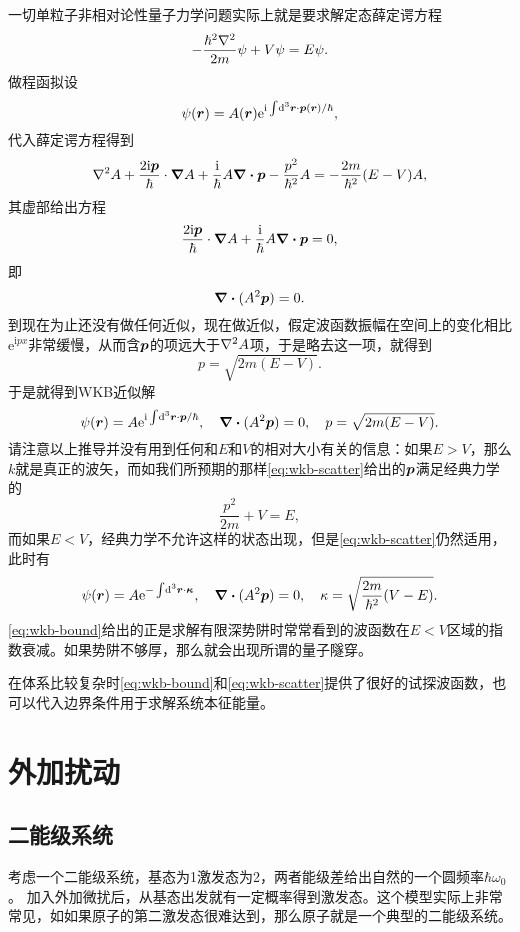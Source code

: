 \documentclass[UTF8, a4paper]{ctexart}
\newcommand*{\ee}{\mathrm{e}}
\newcommand*{\ii}{\mathrm{i}}
\begin{document}
一切单粒子非相对论性量子力学问题实际上就是要求解定态薛定谔方程
\begin{equation}
    - \frac{\hbar^2 \laplacian}{2m} \psi + V \psi = E \psi.
\end{equation}
做程函拟设
\[
    \psi(\vb*{r}) = A(\vb*{r}) \ee^{\ii \int \dd[3]{\vb*{r}} \cdot \vb*{p}(\vb*{r}) / \hbar },
\]
代入薛定谔方程得到
\[
    \laplacian{A} + \frac{2 \ii \vb*{p}}{\hbar} \cdot \grad{A} + \frac{\ii}{\hbar} A \div{\vb*{p}} - \frac{p^2}{\hbar^2} A = - \frac{2m}{\hbar^2} (E - V) A,
\]
其虚部给出方程
\[
    \frac{2 \ii \vb*{p}}{\hbar} \cdot \grad{A} + \frac{\ii}{\hbar} A \div{\vb*{p}} = 0,
\]
即
\[
    \div{(A^2 \vb*{p})} = 0.
\]
到现在为止还没有做任何近似，现在做近似，假定波函数振幅在空间上的变化相比$\ee^{\ii p x}$非常缓慢，从而含$\vb*{p}$的项远大于$\laplacian{A}$项，于是略去这一项，就得到
\[
    p = \sqrt{2m (E-V)}.
\]
于是就得到WKB近似解
\begin{equation}
    \psi(\vb*{r}) = A \ee^{\ii \int \dd[3]{\vb*{r}} \cdot \vb*{p} / \hbar}, \quad \div{(A^2 \vb*{p})} = 0, \quad p = \sqrt{2m (E-V)}.
    \label{eq:wkb-scatter}
\end{equation}
请注意以上推导并没有用到任何和$E$和$V$的相对大小有关的信息：如果$E>V$，那么$k$就是真正的波矢，而如我们所预期的那样\eqref{eq:wkb-scatter}给出的$\vb*{p}$满足经典力学的
\[
    \frac{p^2}{2m} + V = E,
\]
而如果$E < V$，经典力学不允许这样的状态出现，但是\eqref{eq:wkb-scatter}仍然适用，此时有
\begin{equation}
    \psi(\vb*{r}) = A \ee^{- \int \dd[3]{\vb*{r}} \cdot \vb*{\kappa}}, \quad \div{(A^2 \vb*{p})} = 0, \quad \kappa = \sqrt{\frac{2m}{\hbar^2} (V - E)}.
    \label{eq:wkb-bound}
\end{equation}
\eqref{eq:wkb-bound}给出的正是求解有限深势阱时常常看到的波函数在$E<V$区域的指数衰减。如果势阱不够厚，那么就会出现所谓的量子隧穿。

在体系比较复杂时\eqref{eq:wkb-bound}和\eqref{eq:wkb-scatter}提供了很好的试探波函数，也可以代入边界条件用于求解系统本征能量。


\section{外加扰动}

\subsection{二能级系统}

考虑一个二能级系统，基态为1激发态为2，两者能级差给出自然的一个圆频率$\hbar \omega_0$。
加入外加微扰后，从基态出发就有一定概率得到激发态。这个模型实际上非常常见，如如果原子的第二激发态很难达到，那么原子就是一个典型的二能级系统。
\end{document}
